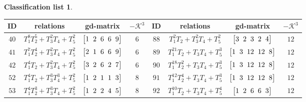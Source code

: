 \documentclass[pdftex]{sigma}%
\theoremstyle{definition}
\newtheorem{class-list}[thm]{Classification list}
\numberwithin{equation}{section}
\begin{document}
\begin{class-list}
\begin{table}[t!]\centering\setlength{\tabcolsep}{3.5pt}
\renewcommand{\arraystretch}{1.25}\small\tabulinesep=1mm
\begin{tabu}{c|c|c|c||c|c|c|c}
\hline
ID&relations&gd-matrix&$-\mathcal{K}^3$&ID&relations&gd-matrix&$-\mathcal{K}^3$
\\
\hline
${40}$&${T_{1}^{8}T_{2}^{5}+T_{3}^{2}T_{4}+T_{5}^{2}}$
&$\arraycolsep=1mm\begin{bmatrix}{1} & {2} & {6} & {6} & {9}\end{bmatrix}$&${6}$
&${88}$&${T_{1}^{2}T_{2}+T_{3}^{2}T_{4}+T_{5}^{2}}$
&$\arraycolsep=1mm\begin{bmatrix}{3} & {2} & {3} & {2} & {4}\end{bmatrix}$&${12}$
\\
\hline
${41}$&${T_{1}^{7}T_{2}^{4}+T_{3}^{2}T_{4}+T_{5}^{2}}$
&$\arraycolsep=1mm\begin{bmatrix}{2} & {1} & {6} & {6} & {9}\end{bmatrix}$&${6}$
&${89}$&${T_{1}^{21}T_{2}+T_{3}T_{4}+T_{5}^{3}}$
&$\arraycolsep=1mm\begin{bmatrix}{1} & {3} & {12} & {12} & {8}\end{bmatrix}$&${12}$
\\
\hline
${42}$&${T_{1}^{4}T_{2}+T_{3}^{2}T_{4}+T_{5}^{2}}$
&$\arraycolsep=1mm\begin{bmatrix}{3} & {2} & {6} & {2} & {7}\end{bmatrix}$&${6}$
&${90}$&${T_{1}^{18}T_{2}^{2}+T_{3}T_{4}+T_{5}^{3}}$
&$\arraycolsep=1mm\begin{bmatrix}{1} & {3} & {12} & {12} & {8}\end{bmatrix}$&${12}$
\\
\hline
${52}$&${T_{1}^{4}T_{2}+T_{3}^{3}T_{4}^{3}+T_{5}^{2}}$
&$\arraycolsep=1mm\begin{bmatrix}{1} & {2} & {1} & {1} & {3}\end{bmatrix}$&${8}$
&${91}$&${T_{1}^{12}T_{2}^{4}+T_{3}T_{4}+T_{5}^{3}}$
&$\arraycolsep=1mm\begin{bmatrix}{1} & {3} & {12} & {12} & {8}\end{bmatrix}$&${12}$
\\
\hline
${53}$&${T_{1}^{4}T_{2}^{3}+T_{3}^{3}T_{4}+T_{5}^{2}}$
&$\arraycolsep=1mm\begin{bmatrix}{1} & {2} & {2} & {4} & {5}\end{bmatrix}$&${8}$
&${92}$&${T_{1}^{10}T_{2}+T_{3}T_{4}+T_{5}^{4}}$
&$\arraycolsep=1mm\begin{bmatrix}{1} & {2} & {6} & {6} & {3}\end{bmatrix}$&${12}$

\end{tabu}
\end{table}
\end{class-list}
\end{document}
